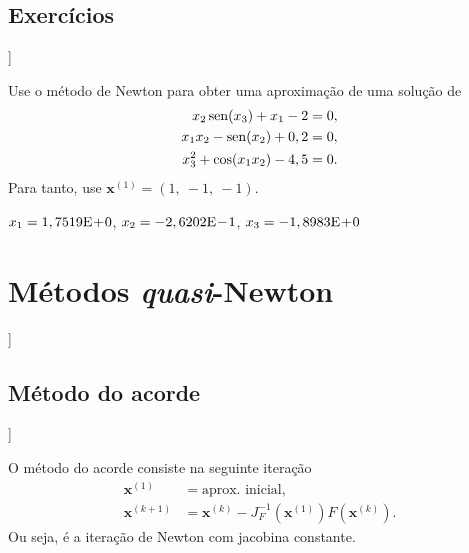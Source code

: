 \subsection{Exercícios}

\begin{flushleft}
  [[tag:revisar]]
\end{flushleft}

\begin{exer}\label{ex:newton_exec}
  Use o método de Newton para obter uma aproximação de uma solução de
  \begin{align}
    x_2\operatorname{sen}(x_3)+x_1-2&=0,\\
    x_1x_2-\operatorname{sen}(x_2)+0,2&=0,\\
    x_3^2+\cos(x_1x_2)-4,5&=0.
  \end{align}
Para tanto, use $\pmb{x}^{(1)} = (1,~-1,~-1)$.
\end{exer}
\begin{resp}
  $x_1 = 1,7519\mathrm{E}\!+\!0$, $x_2 = -2,6202\mathrm{E}\!-\!1$, $x_3 =-1,8983\mathrm{E}\!+\!0$
\end{resp}

\section{Métodos {\it quasi}-Newton}\label{cap_snl_sec_quasi_newton}

\begin{flushleft}
  [[tag:revisar]]
\end{flushleft}

\subsection{Método do acorde}

\begin{flushleft}
  [[tag:revisar]]
\end{flushleft}

O método do acorde consiste na seguinte iteração
\begin{align}
  \pmb{x}^{(1)} &= \text{aprox. inicial},\\
  \pmb{x}^{(k+1)} &= \pmb{x}^{(k)} - J_F^{-1}(\pmb{x}^{(1)})F(\pmb{x}^{(k)}).
\end{align}
Ou seja, é a iteração de Newton com jacobina constante.

